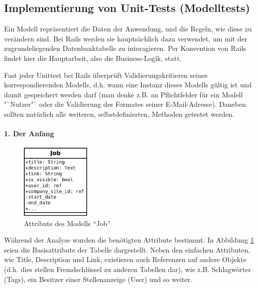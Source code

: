 \subsection{Implementierung von Unit-Tests (Modelltests)}    

Ein Modell repräsentiert die Daten der Anwendung, und die Regeln, wie diese zu verändern sind. Bei Rails werden sie hauptsächlich dazu verwendet, um mit der zugrundeliegenden Datenbanktabelle zu interagieren. Per Konvention von Rails findet hier die Hauptarbeit, also die Business-Logik, statt.

Fast jeder Unittest bei Rails überprüft Validierungskritieren seines korrespondierenden Modells, d.h. wann eine Instanz dieses Modells gültig ist und damit gespeichert werden darf (man denke z.B. an Pflichtfelder für ein Modell "`Nutzer"` oder die Validierung des Formates seiner E-Mail-Adresse). Daneben sollten natürlich alle weiteren, selbstdefinierten, Methoden getestet werden.

\paragraph{1. Der Anfang}
\begin{figure}[h]
 \centering

 \includegraphics[width=0.3\textwidth]{./diagrams/job-erm.png}
 \caption{Attribute des Modells "`Job"'}
  \label{fig:job-erm}
\end{figure}

Während der Analyse wurden die benötigten Attribute bestimmt. In Abbildung \ref{fig:job-erm} seien die Basisattribute der Tabelle dargestellt. Neben den einfachen Attributen, wie Title, Description und Link, existieren auch Referenzen auf andere Objekte (d.h. dies stellen Fremdschlüssel zu anderen Tabellen dar), wie z.B. Schlagwörter (Tags), ein Besitzer einer Stellenanzeige (User) und so weiter.


